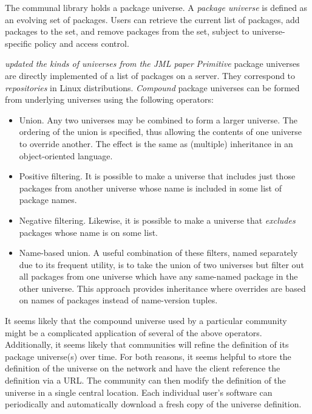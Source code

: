 \documentclass{article}
\newcommand{\hole}[1]{\emph{#1}}
\begin{document}
The communal library holds a package universe.  A \emph{package
universe} is defined as an evolving set of packages.  Users can
retrieve the current list of packages, add packages to the set, and
remove packages from the set, subject to universe-specific policy and
access control.

\hole{updated the kinds of universes from the JML paper}
\emph{Primitive} package universes are directly implemented of a list
of packages on a server.  They correspond to \emph{repositories} in
Linux distributions.  \emph{Compound} package universes can be
formed from underlying universes using the following operators:
\begin{itemize}
\item Union.  Any two universes may be combined to form a larger
      universe.  The ordering of the union is specified, thus allowing
      the contents of one universe to override another.  The effect
      is the same as (multiple) inheritance in an object-oriented language.

\item Positive filtering.  It is possible to make a universe that
      includes just those packages from another universe whose
      name is included in some list of package names.

\item Negative filtering.  Likewise, it is possible to make a universe
      that \emph{excludes} packages whose name is on some list.

\item Name-based union.  A useful combination of these filters, named
      separately due to its frequent utility, is to take the union of
      two universes but filter out all packages from one universe
      which have any same-named package in the other universe.  This
      approach provides inheritance where overrides are based on names
      of packages instead of name-version tuples.
\end{itemize}


It seems likely that the compound universe used by a particular
community might be a complicated application of several of the above
operators.  Additionally, it seems likely that communities will refine
the definition of its package universe(s) over time.  For both
reasons, it seems helpful to store the definition of the universe on
the network and have the client reference the definition via a URL.
The community can then modify the definition of the universe in a
single central location.  Each individual user's software can
periodically and automatically download a fresh copy of the universe
definition.
\end{document}
